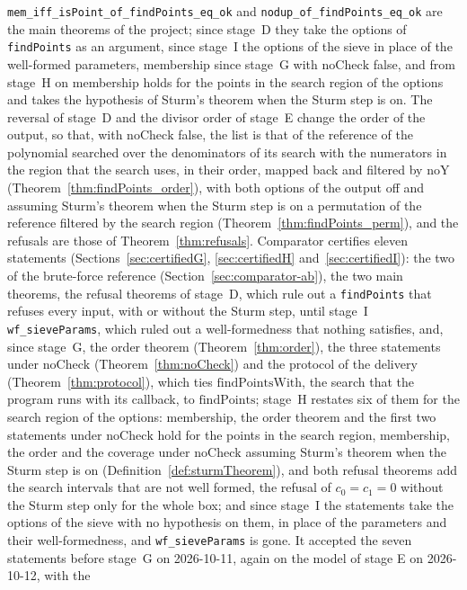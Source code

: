 \verb|mem_iff_isPoint_of_findPoints_eq_ok| and \verb|nodup_of_findPoints_eq_ok| are the main
theorems of the project; since stage~D they take the options of \verb|findPoints| as an argument,
since stage~I the options of the sieve in place of the well-formed parameters, membership since
stage~G with $\mathrm{noCheck}$ false, and from stage~H on membership holds for the points in the
search region of the options and takes the hypothesis of Sturm's theorem when the Sturm step is on.
The reversal of stage~D and the divisor order of stage~E change the order of the output, so that,
with $\mathrm{noCheck}$ false, the list is that of the reference of the polynomial searched over the
denominators of its search with the numerators in the region that the search uses, in their order,
mapped back and filtered by $\mathrm{noY}$ (Theorem~\ref{thm:findPoints_order}), with both options
of the output off and assuming Sturm's theorem when the Sturm step is on a permutation of the
reference filtered by the search region (Theorem~\ref{thm:findPoints_perm}), and the refusals are
those of Theorem~\ref{thm:refusals}. Comparator certifies eleven statements
(Sections~\ref{sec:certifiedG}, \ref{sec:certifiedH} and~\ref{sec:certifiedI}): the two of the
brute-force reference (Section~\ref{sec:comparator-ab}), the two main theorems, the refusal theorems
of stage~D, which rule out a \verb|findPoints| that refuses every input, with or without the Sturm
step, until stage~I \verb|wf_sieveParams|, which ruled out a well-formedness that nothing satisfies,
and, since stage~G, the order theorem (Theorem~\ref{thm:order}), the three statements under
$\mathrm{noCheck}$ (Theorem~\ref{thm:noCheck}) and the protocol of the delivery
(Theorem~\ref{thm:protocol}), which ties $\mathrm{findPointsWith}$, the search that the program runs
with its callback, to $\mathrm{findPoints}$; stage~H restates six of them for the search region of
the options: membership, the order theorem and the first two statements under $\mathrm{noCheck}$
hold for the points in the search region, membership, the order and the coverage under
$\mathrm{noCheck}$ assuming Sturm's theorem when the Sturm step is on
(Definition~\ref{def:sturmTheorem}), and both refusal theorems add the search intervals that are not
well formed, the refusal of $c_0 = c_1 = 0$ without the Sturm step only for the whole box; and since
stage~I the statements take the options of the sieve with no hypothesis on them, in place of the
parameters and their well-formedness, and \verb|wf_sieveParams| is gone. It accepted the seven
statements before stage~G on 2026-10-11, again on the model of stage E on 2026-10-12, with the
